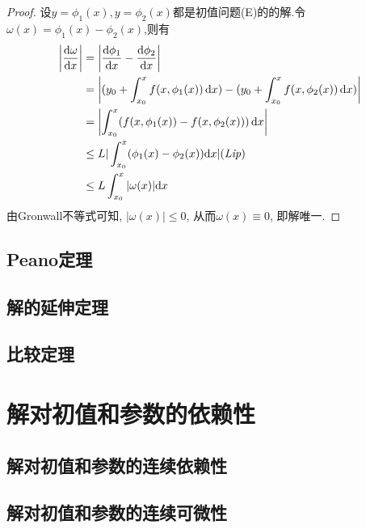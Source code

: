 \begin{proof}
    设$y=\phi_1(x),y=\phi_2(x)$都是初值问题(E)的的解.令$\omega(x)=\phi_1(x)-\phi_2(x)$,则有
    $$\begin{aligned}
        \left| \frac{{\rm d}\omega}{{\rm d}x} \right| &= \left| \frac{{\rm d}\phi_1}{{\rm d}x} - \frac{{\rm d}\phi_2}{{\rm d}x} \right| \\
        &= \left| (y_0 + \int_{x_0}^x f(x, \phi_1(x)) \, {\rm d}x) - (y_0 + \int_{x_0}^x f(x, \phi_2(x)) \, {\rm d}x) \right| \\
        &= \left| \int_{x_0}^{x} (f(x, \phi_1(x)) - f(x, \phi_2(x))) \, {\rm d}x \right|\\
        &\leq L|\int_{x_0}^x(\phi_1(x)-\phi_2(x)){\rm d}x|(\mathit{Lip})\\
        &\leq L\int_{x_0}^{x}|\omega(x)|{\rm d}x
        \end{aligned}
    $$
    由Gronwall不等式可知, $|\omega(x)|\leq 0$, 从而$\omega(x)\equiv 0$, 即解唯一.
\end{proof}
\section{Peano定理}
\section{解的延伸定理}
\section{比较定理}
\newpage

\chapter{解对初值和参数的依赖性}
\section{解对初值和参数的连续依赖性}
\section{解对初值和参数的连续可微性}

\newpage
